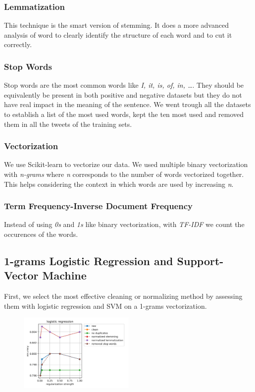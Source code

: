 \documentclass[11pt, a4paper, twocolumn]{article}
\begin{document}
\subsubsection{Lemmatization}
This technique is the smart version of stemming. It does a more advanced analysis of word to clearly identify the structure of each word and to cut it correctly.

\subsubsection{Stop Words}
Stop words are the most common words like \textit{I, it, is, of, in, \dots}. They should be equivalently be present in both positive and negative datasets but they do not have real impact in the meaning of the sentence. We went trough all the datasets to establish a list of the most used words, kept the ten most used and removed them in all the tweets of the training sets.

\subsubsection{Vectorization}
We use Scikit-learn to vectorize our data. We used multiple binary vectorization with \textit{n-grams} where \textit{n} corresponds to the number of words vectorized together. This helps considering the context in which words are used by increasing \textit{n}.

\subsubsection{Term Frequency-Inverse Document Frequency}
Instead of using \textit{0s} and \textit{1s} like binary vectorization, with \textit{TF-IDF} we count the occurences of the words.

\subsection{1-grams Logistic Regression and Support-Vector Machine}
First, we select the most effective cleaning or normalizing method by assessing them with logistic regression and SVM on a 1-grams vectorization.

\begin{figure}[h]
	\centering
	\includegraphics[width=0.5\textwidth]{../plots/logreg.png}
\end{figure}
\end{document}
